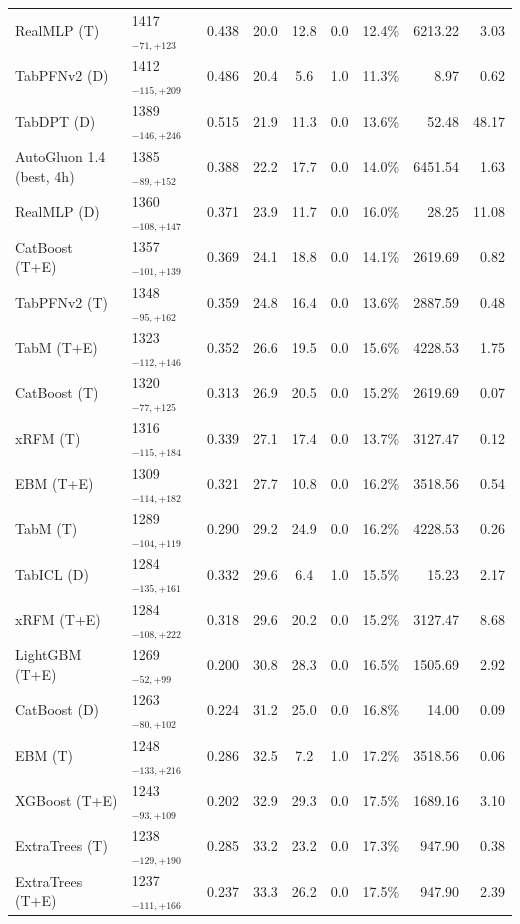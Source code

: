 \begin{tabular}{llcccccrr}
RealMLP (T) & 1417${}_{-71,+123}$ & 0.438 & 20.0 & 12.8 & 0.0 & 12.4\% & 6213.22 & 3.03 \\
TabPFNv2 (D) & 1412${}_{-115,+209}$ & 0.486 & 20.4 & 5.6 & 1.0 & 11.3\% & 8.97 & 0.62 \\
TabDPT (D) & 1389${}_{-146,+246}$ & 0.515 & 21.9 & 11.3 & 0.0 & 13.6\% & 52.48 & 48.17 \\
AutoGluon 1.4 (best, 4h) & 1385${}_{-89,+152}$ & 0.388 & 22.2 & 17.7 & 0.0 & 14.0\% & 6451.54 & 1.63 \\
RealMLP (D) & 1360${}_{-108,+147}$ & 0.371 & 23.9 & 11.7 & 0.0 & 16.0\% & 28.25 & 11.08 \\
CatBoost (T+E) & 1357${}_{-101,+139}$ & 0.369 & 24.1 & 18.8 & 0.0 & 14.1\% & 2619.69 & 0.82 \\
TabPFNv2 (T) & 1348${}_{-95,+162}$ & 0.359 & 24.8 & 16.4 & 0.0 & 13.6\% & 2887.59 & 0.48 \\
TabM (T+E) & 1323${}_{-112,+146}$ & 0.352 & 26.6 & 19.5 & 0.0 & 15.6\% & 4228.53 & 1.75 \\
CatBoost (T) & 1320${}_{-77,+125}$ & 0.313 & 26.9 & 20.5 & 0.0 & 15.2\% & 2619.69 & 0.07 \\
xRFM (T) & 1316${}_{-115,+184}$ & 0.339 & 27.1 & 17.4 & 0.0 & 13.7\% & 3127.47 & 0.12 \\
EBM (T+E) & 1309${}_{-114,+182}$ & 0.321 & 27.7 & 10.8 & 0.0 & 16.2\% & 3518.56 & 0.54 \\
TabM (T) & 1289${}_{-104,+119}$ & 0.290 & 29.2 & 24.9 & 0.0 & 16.2\% & 4228.53 & 0.26 \\
TabICL (D) & 1284${}_{-135,+161}$ & 0.332 & 29.6 & 6.4 & 1.0 & 15.5\% & 15.23 & 2.17 \\
xRFM (T+E) & 1284${}_{-108,+222}$ & 0.318 & 29.6 & 20.2 & 0.0 & 15.2\% & 3127.47 & 8.68 \\
LightGBM (T+E) & 1269${}_{-52,+99}$ & 0.200 & 30.8 & 28.3 & 0.0 & 16.5\% & 1505.69 & 2.92 \\
CatBoost (D) & 1263${}_{-80,+102}$ & 0.224 & 31.2 & 25.0 & 0.0 & 16.8\% & 14.00 & 0.09 \\
EBM (T) & 1248${}_{-133,+216}$ & 0.286 & 32.5 & 7.2 & 1.0 & 17.2\% & 3518.56 & 0.06 \\
XGBoost (T+E) & 1243${}_{-93,+109}$ & 0.202 & 32.9 & 29.3 & 0.0 & 17.5\% & 1689.16 & 3.10 \\
ExtraTrees (T) & 1238${}_{-129,+190}$ & 0.285 & 33.2 & 23.2 & 0.0 & 17.3\% & 947.90 & 0.38 \\
ExtraTrees (T+E) & 1237${}_{-111,+166}$ & 0.237 & 33.3 & 26.2 & 0.0 & 17.5\% & 947.90 & 2.39 \\

\end{tabular}
